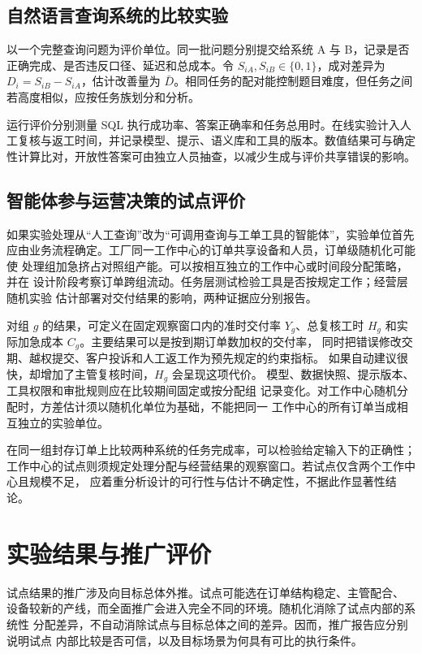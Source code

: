 \subsection{自然语言查询系统的比较实验}
以一个完整查询问题为评价单位。同一批问题分别提交给系统 A 与 B，记录是否正确完成、是否违反口径、延迟和总成本。令 \(S_{iA},S_{iB}\in\{0,1\}\)，成对差异为 \(D_i=S_{iB}-S_{iA}\)，估计改善量为 \(\bar D\)。相同任务的配对能控制题目难度，但任务之间若高度相似，应按任务族划分和分析。

运行评价分别测量 SQL 执行成功率、答案正确率和任务总用时。在线实验计入人工复核与返工时间，并记录模型、提示、语义库和工具的版本。数值结果可与确定性计算比对，开放性答案可由独立人员抽查，以减少生成与评价共享错误的影响。

\subsection{智能体参与运营决策的试点评价}
如果实验处理从“人工查询”改为“可调用查询与工单工具的智能体”，实验单位首先
应由业务流程确定。工厂同一工作中心的订单共享设备和人员，订单级随机化可能使
处理组加急挤占对照组产能。可以按相互独立的工作中心或时间段分配策略，并在
设计阶段考察订单跨组流动。任务层测试检验工具是否按规定工作；经营层随机实验
估计部署对交付结果的影响，两种证据应分别报告。

对组 \(g\) 的结果，可定义在固定观察窗口内的准时交付率 \(Y_g\)、总复核工时
\(H_g\) 和实际加急成本 \(C_g\)。主要结果可以是按到期订单数加权的交付率，
同时把错误修改交期、越权提交、客户投诉和人工返工作为预先规定的约束指标。
如果自动建议很快，却增加了主管复核时间，\(H_g\) 会呈现这项代价。
模型、数据快照、提示版本、工具权限和审批规则应在比较期间固定或按分配组
记录变化。对工作中心随机分配时，方差估计须以随机化单位为基础，不能把同一
工作中心的所有订单当成相互独立的实验单位。

在同一组封存订单上比较两种系统的任务完成率，可以检验给定输入下的正确性；
工作中心的试点则须规定处理分配与经营结果的观察窗口。若试点仅含两个工作中心且规模不足，
应着重分析设计的可行性与估计不确定性，不据此作显著性结论。

\section{实验结果与推广评价}

试点结果的推广涉及向目标总体外推。试点可能选在订单结构稳定、主管配合、
设备较新的产线，而全面推广会进入完全不同的环境。随机化消除了试点内部的系统性
分配差异，不自动消除试点与目标总体之间的差异。因而，推广报告应分别说明试点
内部比较是否可信，以及目标场景为何具有可比的执行条件。

